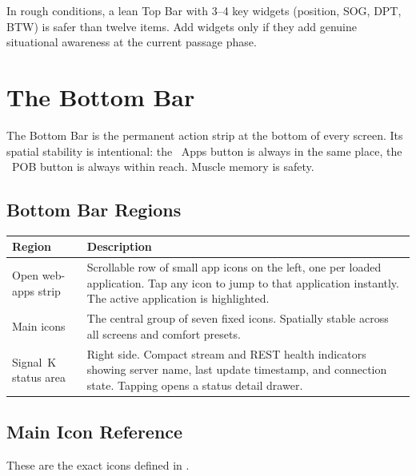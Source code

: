 \begin{tipbox}
In rough conditions, a lean Top Bar with 3--4 key widgets (position, SOG, DPT, BTW)
is safer than twelve items.
Add widgets only if they add genuine situational awareness at the current passage
phase.
\end{tipbox}

\chapter{The Bottom Bar}
\label{ch:bottombar}

The Bottom Bar is the permanent action strip at the bottom of every screen.
Its spatial stability is intentional: the ~Apps button is always
in the same place, the ~POB button is always within reach.
Muscle memory is safety.


\section{Bottom Bar Regions}

\begin{longtable}{L{3.6cm}L{10.1cm}}
\toprule
{}
\color{white}\sffamily\bfseries Region &
\color{white}\sffamily\bfseries Description \\
\midrule
Open web-apps strip &
  Scrollable row of small app icons on the left, one per loaded application.
  Tap any icon to jump to that application instantly.
  The active application is highlighted. \\
Main icons &
  The central group of seven fixed icons.
  Spatially stable across all screens and comfort presets. \\
Signal~K status area &
  Right side. Compact stream and REST health indicators showing server name,
  last update timestamp, and connection state.
  Tapping opens a status detail drawer. \\
\bottomrule
\end{longtable}

\section{Main Icon Reference}

These are the exact icons defined in .

